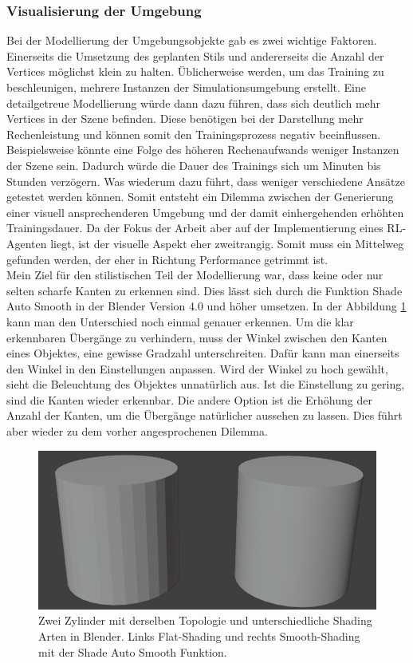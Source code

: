 \subsubsection{Visualisierung der Umgebung}
\label{vis_umgebung}
Bei der Modellierung der Umgebungsobjekte gab es zwei wichtige Faktoren. Einerseits die Umsetzung des geplanten Stils und andererseits die Anzahl der Vertices möglichst klein zu halten. Üblicherweise werden, um das Training zu beschleunigen, mehrere Instanzen der Simulationsumgebung erstellt. Eine detailgetreue Modellierung würde dann dazu führen, dass sich deutlich mehr Vertices in der Szene befinden. Diese benötigen bei der Darstellung mehr Rechenleistung und können somit den Trainingsprozess negativ beeinflussen. Beispielsweise könnte eine Folge des höheren Rechenaufwands weniger Instanzen der Szene sein. Dadurch würde die Dauer des Trainings sich um Minuten bis Stunden verzögern. Was wiederum dazu führt, dass weniger verschiedene Ansätze getestet werden können. Somit entsteht ein Dilemma zwischen der Generierung einer visuell ansprechenderen Umgebung und der damit einhergehenden erhöhten Trainingsdauer. Da der Fokus der Arbeit aber auf der Implementierung eines RL-Agenten liegt, ist der visuelle Aspekt eher zweitrangig. Somit muss ein Mittelweg gefunden werden, der eher in Richtung Performance getrimmt ist. 
\\
Mein Ziel für den stilistischen Teil der Modellierung war, dass keine oder nur selten scharfe Kanten zu erkennen sind. Dies lässt sich durch die Funktion \dq Shade Auto Smooth\dq{} in der Blender Version 4.0 und höher umsetzen. In der Abbildung \ref{fig:flat_smooth} kann man den Unterschied noch einmal genauer erkennen. Um die klar erkennbaren Übergänge zu verhindern, muss der Winkel zwischen den Kanten eines Objektes, eine gewisse Gradzahl unterschreiten. Dafür kann man einerseits den Winkel in den Einstellungen anpassen. Wird der Winkel zu hoch gewählt, sieht die Beleuchtung des Objektes unnatürlich aus. Ist die Einstellung zu gering, sind die Kanten wieder erkennbar. Die andere Option ist die Erhöhung der Anzahl der Kanten, um die Übergänge natürlicher aussehen zu lassen. Dies führt aber wieder zu dem vorher angesprochenen Dilemma. 
\begin{figure} [ht]
	\centering
	\includegraphics[width=0.7\columnwidth]{img/flat_smooth}
	\caption[Flat-Shading und Smooth-Shading]{Zwei Zylinder mit derselben Topologie und unterschiedliche Shading Arten in Blender. Links Flat-Shading und rechts Smooth-Shading mit der \dq Shade Auto Smooth\dq{} Funktion.}
	\label{fig:flat_smooth}
\end{figure}
